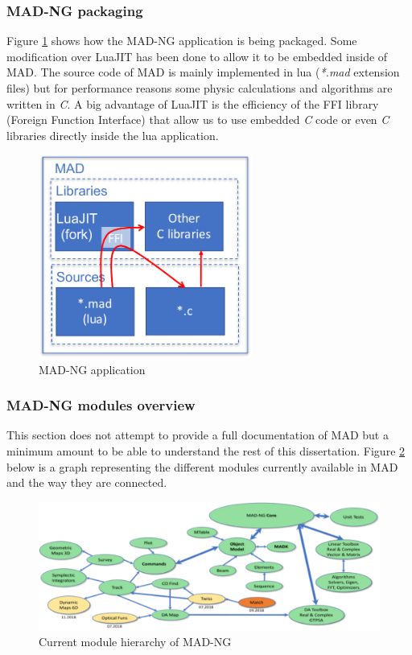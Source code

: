 \subsubsection{MAD-NG packaging}
\label{Subsec:mad-pk}

Figure \ref{fig:mad} shows how the MAD-NG application is being packaged. Some
modification over LuaJIT has been done to allow it to be embedded inside of MAD.
The source code of MAD is mainly implemented in lua (\emph{*.mad} extension
files) but for performance reasons some physic calculations and algorithms are
written in \emph{C}. A big advantage of LuaJIT is the efficiency of the FFI
library (Foreign Function Interface) that allow us to use embedded \emph{C} code
or even \emph{C} libraries directly inside the lua application.

\begin{figure}[H]
    \centering
	\includegraphics[width=7cm]{./Images/MAD.pdf}
    \caption{MAD-NG application}
    \label{fig:mad}
\end{figure}

\subsubsection{MAD-NG modules overview}
\label{Subsec:mad-doc}

This section does not attempt to provide a full documentation of MAD but a
minimum amount to be able to understand the rest of this dissertation.
Figure \ref{fig:mad-graph} below is a graph representing the different
modules currently available in MAD and the way they are connected.

\begin{figure}[H]
    \centering
	\includegraphics[width=\textwidth]{./Images/mad-graph.pdf}
    \caption{Current module hierarchy of MAD-NG}
    \label{fig:mad-graph}
\end{figure}

